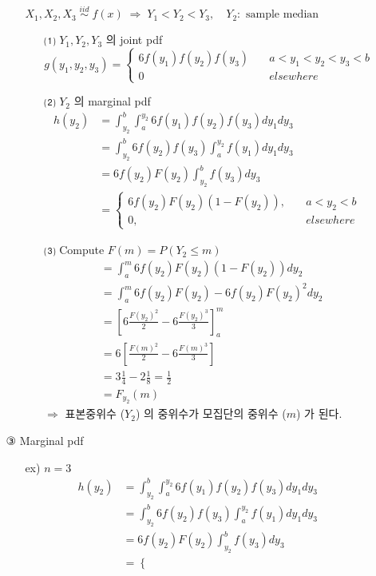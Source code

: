 \documentclass{oblivoir}
\begin{document}
\begin{itemize}
\begin{itemize}
\begin{itemize}
$X_1, X_2, X_3 \;\overset{iid}{\sim}\; f(x) \;\Rightarrow \; Y_1 < Y_2 < Y_3, \quad Y_2 : \mbox{ sample median}$
\begin{itemize}
\item[⑴] $Y_1, Y_2, Y_3$ 의 joint pdf
$$
g(y_1, y_2, y_3) = 
\begin{cases}
6 f(y_1)f(y_2)f(y_3) \quad & a < y_1 < y_2 < y_3 < b \\
0 & elsewhere
\end{cases} 
$$
\item[⑵] $Y_2$ 의 marginal pdf
\begin{align*}
h(y_2) &= \int_{y_2}^b \int_a^{y_2} 6 f(y_1)f(y_2)f(y_3) dy_1 dy_3 \\
&= \int_{y_2}^b 6f(y_2)f(y_3) \int_a^{y_2} f(y_1) dy_1 dy_3 \\
&= 6f(y_2)F(y_2) \int_{y_2}^b f(y_3) dy_3 \\
&= 
\begin{cases}
6f(y_2)F(y_2)(1-F(y_2)), \quad & a < y_2 < b\\
0, & elsewhere
\end{cases}
\end{align*}
\item[⑶] Compute $F(m) =  P(Y_2 \leq m)$
\begin{align*}
&= \int_a^m 6f(y_2)F(y_2)(1-F(y_2)) dy_2 \\
&= \int_a^m 6f(y_2)F(y_2) - 6f(y_2)F(y_2)^2 dy_2 \\
&= \left[6\frac{F(y_2)^2}{2} - 6\frac{F(y_2)^3}{3} \right]_a^m \\
&=6 \left[\frac{F(m)^2}{2} - 6\frac{F(m)^3}{3} \right]  \\
&=3\frac{1}{4} - 2 \frac{1}{8} = \frac{1}{2} \\
&= F_{y_2} (m)
\end{align*}
$\Rightarrow$ 표본중위수 ($Y_2$) 의 중위수가 모집단의 중위수 ($m$) 가 된다.
\end{itemize}
\end{itemize}
\item[③] Marginal pdf
\begin{itemize}
\item[ex)] $n = 3$
\begin{align*}
h(y_2) &= \int_{y_2}^b \int_a^{y_2} 6 f(y_1)f(y_2)f(y_3) dy_1 dy_3 \\
&= \int_{y_2}^b 6f(y_2)f(y_3) \int_a^{y_2} f(y_1) dy_1 dy_3 \\
&= 6f(y_2)F(y_2) \int_{y_2}^b f(y_3) dy_3 \\
&= 
\begin{cases}

\end{cases}
\end{align*}
\end{itemize}
\end{itemize}
\end{itemize}
\end{document}
